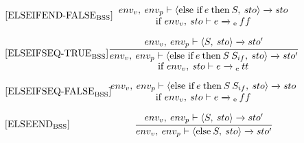 \begin{equation}
\begin{minipage}{.2\linewidth}
$[\text{ELSEIFEND-FALSE}_\text{BSS}]$
\end{minipage}
\begin{minipage}{.8\linewidth}
\centering
$env_v, \: env_p \vdash \langle \text{else if} \: e \: \text{then} \: S, \: sto \rangle \xrightarrow{} sto$ 
\\
if $env_v, \: sto \vdash e \xrightarrow{}\textsubscript{e} \: ff$
\end{minipage}
\end{equation}

\begin{equation}
\begin{minipage}{.2\linewidth}
$[\text{ELSEIFSEQ-TRUE}_\text{BSS}]$
\end{minipage}
\begin{minipage}{.8\linewidth}
\centering
$\cfrac{env_v, \: env_p \vdash \langle S, \: sto \rangle \xrightarrow{} sto'}{env_v, \: env_p \vdash \langle \text{else if} \: e \: \text{then} \: S \: S_{if}, \: sto \rangle \xrightarrow{} sto'}$ 
\\
if $env_v, \: sto \vdash e \xrightarrow{}\textsubscript{e} \: tt$
\end{minipage}
\end{equation}

\begin{equation}
\begin{minipage}{.2\linewidth}
$[\text{ELSEIFSEQ-FALSE}_\text{BSS}]$
\end{minipage}
\begin{minipage}{.8\linewidth}
\centering
${env_v, \: env_p \vdash \langle \text{else if} \: e \: \text{then} \: S \: S_{if}, \: sto \rangle \xrightarrow{} sto}$ 
\\
if $env_v, \: sto \vdash e \xrightarrow{}\textsubscript{e} \: ff$
\end{minipage}
\end{equation}

\begin{equation}
\begin{minipage}{.2\linewidth}
$[\text{ELSEEND}_\text{BSS}]$
\end{minipage}
\begin{minipage}{.8\linewidth}
\centering
$\cfrac{env_v, \: env_p \vdash \langle S, \: sto \rangle \xrightarrow{} sto'}{env_v, \: env_p \vdash \langle \text{else} \: S, \: sto \rangle \xrightarrow{} sto'}$ 
\end{minipage}
\end{equation}

